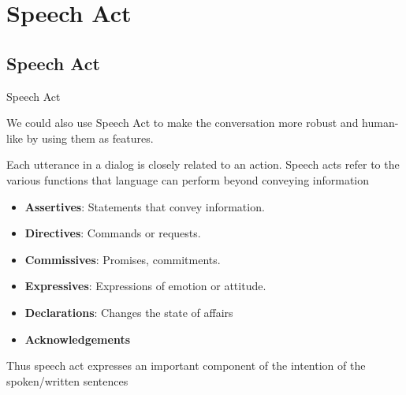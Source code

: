 \section{Speech Act}
\subsection{Speech Act}
\begin{frame}{Speech Act}

    We could also  use Speech Act to make the conversation more robust and human-like by using them as features.
    \vspace{3mm}

    Each utterance in a dialog is closely related to an action. Speech acts refer to the various functions that language can perform beyond conveying information
    \begin{itemize}
        \item \textbf{Assertives}: Statements that convey information.
\item \textbf{Directives}: Commands or requests.
\item \textbf{Commissives}: Promises, commitments.
\item \textbf{Expressives}: Expressions of emotion or attitude.
\item \textbf{Declarations}: Changes the state of affairs
\item \textbf{Acknowledgements}

    \end{itemize}

    Thus speech act expresses an important component of the intention of the spoken/written sentences
\end{frame}

